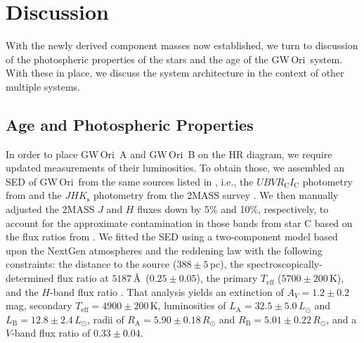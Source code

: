 \documentclass[twocolumn]{aastex61}
\newcommand{\obj}{GW\,Ori}
\begin{document}
\section{Discussion} \label{sec:discussion}

With the newly derived component masses now established, we turn to discussion of the photospheric properties of the stars and the age of the \obj\ system. With these in place, we discuss the system architecture in the context of other multiple systems.



\subsection{Age and Photospheric Properties}

In order to place \obj~A and \obj~B on the HR diagram, we require updated measurements of their luminosities. To obtain those, we assembled an SED of \obj\ from the same sources listed in \citet{fang14}, i.e., the $U B V R_\mathrm{C} I_\mathrm{C}$ photometry from \citet{calvet04} and the $JHK_\mathrm{s}$ photometry from the 2MASS survey \citep{skrutskie06}. We then manually adjusted the 2MASS $J$ and $H$ fluxes down by 5\% and 10\%, respectively, to account for the approximate contamination in those bands from star C based on the flux ratios from \citet{berger11}. We fitted the SED using a two-component model based upon the NextGen atmospheres \citep{hauschildt99} and the \citet{cardelli89} reddening law with the following constraints: the distance to the source ($388\pm 5$\,pc), the spectroscopically-determined flux ratio at $5187$\,\AA\ ($0.25 \pm 0.05$), the primary $T_\mathrm{eff}$ ($5700\pm 200$\,K), and the $H$-band flux ratio \citep[$f_\mathrm{B} / f_\mathrm{A} = 0.57 \pm 0.05$;][]{berger11}. That analysis yields an extinction of $A_V = 1.2 \pm 0.2$\,mag, secondary $T_\mathrm{eff} = 4900 \pm 200$\,K, luminosities of $L_\mathrm{A} = 32.5 \pm 5.0\,L_\odot$ and $L_\mathrm{B} = 12.8 \pm 2.4\,L_\odot$, radii of $R_\mathrm{A} = 5.90 \pm 0.18\,R_\odot$ and $R_\mathrm{B} = 5.01 \pm 0.22\,R_\odot$, and a $V$-band flux ratio of $0.33\pm0.04$.
\end{document}

